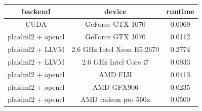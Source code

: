 \documentclass[9pt,twocolumn,twoside,notitlepage]{article}
\begin{document}
\begin{table}[htbp]
\centering
\begin{tabular}{ccc}
\hline
backend & device & runtime \\
\hline
CUDA  & GeForce GTX 1070  & 0.0069 \\
plaidml2 + opencl & GeForce GTX 1070 & 0.0112 \\
plaidml2 + LLVM  & 2.6 GHz Intel Xeon E5-2670 & 0.2774 \\
plaidml2 + LLVM  &  2.6 GHz Intel Core i7 & 0.0933\\
plaidml2 + opencl & AMD FIJI & 0.0413 \\
plaidml2 + opencl & AMD GFX906 & 0.0235\\
plaidml2 + opencl & AMD radeon pro 560x & 0.0500\\
\hline
\end{tabular}
  \label{tab:shapefunctions}
\end{table}
\end{document}
